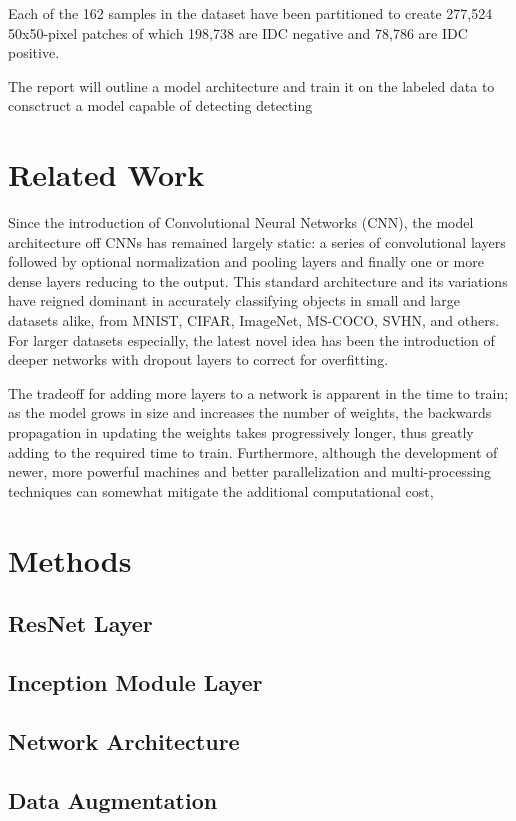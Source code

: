 \documentclass[conference]{IEEEtran}
\begin{document}
Each of the 162 samples in the dataset have been partitioned to create 277,524 50x50-pixel patches of which 198,738 are IDC negative and 78,786 are IDC positive.

The report will outline a model architecture and train it on the labeled data to consctruct a model capable of detecting detecting

\section{Related Work}
Since the introduction of Convolutional Neural Networks (CNN), the model architecture off CNNs has remained largely static: a series of convolutional layers followed by optional normalization and pooling layers and finally one or more dense layers reducing to the output. This standard architecture and its variations have reigned dominant in accurately classifying objects in small and large datasets alike, from MNIST, CIFAR, ImageNet, MS-COCO, SVHN, and others. For larger datasets especially, the latest novel idea has been the introduction of deeper networks with dropout layers to correct for overfitting.

The tradeoff for adding more layers to a network is apparent in the time to train; as the model grows in size and increases the number of weights, the backwards propagation in updating the weights takes progressively longer, thus greatly adding to the required time to train. Furthermore, although the development of newer, more powerful machines and better parallelization and multi-processing techniques can somewhat mitigate the additional computational cost, 

\section{Methods}
\subsection{ResNet Layer}
\subsection{Inception Module Layer}
\subsection{Network Architecture}
\subsection{Data Augmentation}
\end{document}
